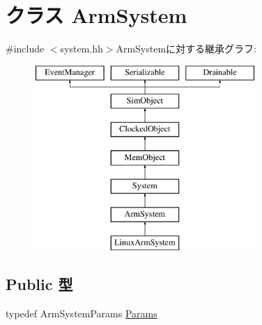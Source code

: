 \hypertarget{classArmSystem}{
\section{クラス ArmSystem}
\label{classArmSystem}
}


{\ttfamily \#include $<$system.hh$>$}ArmSystemに対する継承グラフ:\begin{figure}[H]
\begin{center}
\leavevmode
\includegraphics[height=7cm]{classArmSystem}
\end{center}
\end{figure}
\subsection*{Public 型}
\begin{DoxyCompactItemize}
\item 
typedef ArmSystemParams \hyperlink{classArmSystem_a8ae84e66b34bac08937a6bad4412ba5d}{Params}
\end{DoxyCompactItemize}
